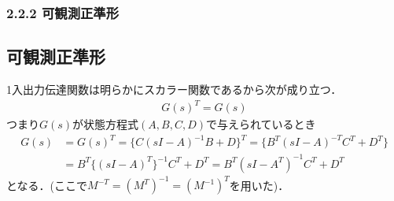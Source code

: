 \begin{frame}[t]
\frametitle{2.2.2 可観測正準形}
\subsection{可観測正準形}

1入出力伝達関数は明らかにスカラー関数であるから次が成り立つ．
\begin{align}
 G(s)^T = G(s)
\end{align}
つまり$G(s)$が状態方程式$(A,B,C,D)$で与えられているとき
\begin{align}
 G(s) &= G(s)^T = \{ C(sI-A)^{-1}B + D\} ^T = \{ B^T (sI-A)^{-T} C^T + D^T\} 
\nonumber\\
 &= B^T \{(sI-A)^{T}\}^{-1} C^T + D^T = B^T (sI - A^{T})^{-1} C^T + D^T
\end{align}
となる．(ここで$M^{-T} = (M^{T})^{-1} = (M^{-1})^T$を用いた)．

\end{frame}

